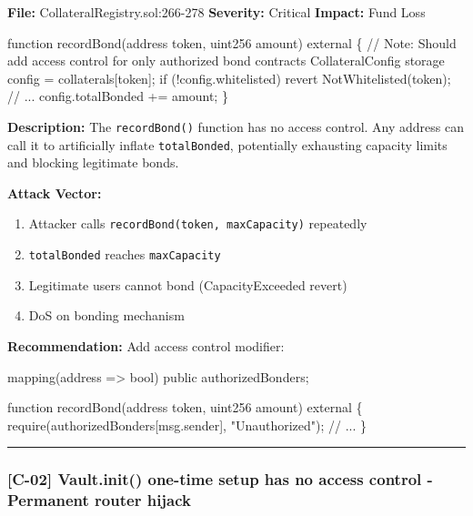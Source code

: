 \documentclass[
]{article}
\newenvironment{Shaded}{}{}
\newcommand{\NormalTok}[1]{#1}
\providecommand{\tightlist}{%
  \setlength{\itemsep}{0pt}\setlength{\parskip}{0pt}}
\begin{document}
\textbf{File:} CollateralRegistry.sol:266-278 \textbf{Severity:}
Critical \textbf{Impact:} Fund Loss

\begin{Shaded}
\begin{Highlighting}[]
\NormalTok{function recordBond(address token, uint256 amount) external \{}
\NormalTok{    // Note: Should add access control for only authorized bond contracts}
\NormalTok{    CollateralConfig storage config = collaterals[token];}
\NormalTok{    if (!config.whitelisted) revert NotWhitelisted(token);}
\NormalTok{    // ...}
\NormalTok{    config.totalBonded += amount;}
\NormalTok{\}}
\end{Highlighting}
\end{Shaded}

\textbf{Description:} The \texttt{recordBond()} function has no access
control. Any address can call it to artificially inflate
\texttt{totalBonded}, potentially exhausting capacity limits and
blocking legitimate bonds.

\textbf{Attack Vector:}

\begin{enumerate}
\def\labelenumi{\arabic{enumi}.}
\tightlist
\item
  Attacker calls \texttt{recordBond(token,\ maxCapacity)} repeatedly
\item
  \texttt{totalBonded} reaches \texttt{maxCapacity}
\item
  Legitimate users cannot bond (CapacityExceeded revert)
\item
  DoS on bonding mechanism
\end{enumerate}

\textbf{Recommendation:} Add access control modifier:

\begin{Shaded}
\begin{Highlighting}[]
\NormalTok{mapping(address =\textgreater{} bool) public authorizedBonders;}

\NormalTok{function recordBond(address token, uint256 amount) external \{}
\NormalTok{    require(authorizedBonders[msg.sender], "Unauthorized");}
\NormalTok{    // ...}
\NormalTok{\}}
\end{Highlighting}
\end{Shaded}

\begin{center}\rule{0.5\linewidth}{0.5pt}\end{center}

\subsubsection{{[}C-02{]} Vault.init() one-time setup has no access
control - Permanent router
hijack}\label{c-02-vaultinit-one-time-setup-has-no-access-control---permanent-router-hijack}
\end{document}
